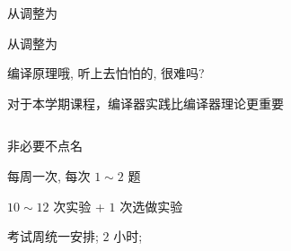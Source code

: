 
\begin{frame}{}
  \begin{center}
    从调整为

    \vspace{0.60cm}

    \vspace{0.60cm}
    从调整为
  \end{center}
\end{frame}

\begin{frame}{}
  \begin{center}

    \vspace{0.50cm}
    {编译原理哦, 听上去怕怕的, 很难吗?}
  \end{center}
\end{frame}

\begin{frame}{}

    \pause
    \vspace{0.50cm}
    对于本学期课程，编译器实践比编译器理论更重要
\end{frame}

\begin{frame}{}
  \begin{columns}
      \begin{description}[<+->]
        \setlength{\itemsep}{25pt}
        \item[\blue{\bf 考勤 ($00\%$):}] 非必要不点名
        \item[\cyan{\bf 平时作业 ($00\%$):}] 每周一次, 每次 $1 \sim 2$ 题
        \item[\red{\bf 课程实验 ($75\%$):}] $10 \sim 12$ 次实验 + $1$ 次选做实验 
        \item[\red{\bf 期末测试 ($25\%$):}] 考试周统一安排; $2$ 小时; 
      \end{description}
  \end{columns}
\end{frame}

